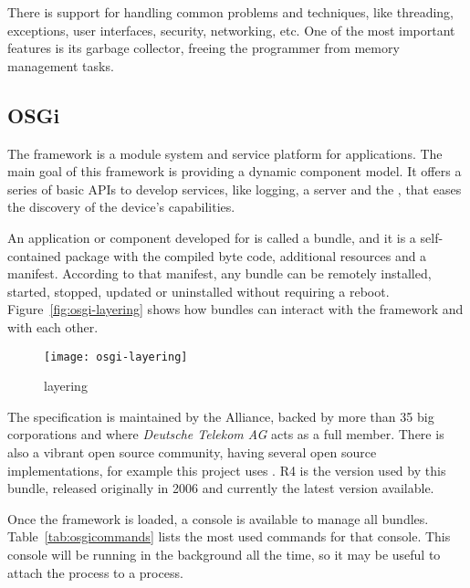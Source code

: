 There is support for handling common problems and techniques, like threading, exceptions, user interfaces, security, networking, etc.
One of the most important features is its garbage collector, freeing the programmer from memory management tasks.


\subsection{OSGi} %
\label{sub:osgi}

The  framework is a module system and service platform for  applications.
The main goal of this framework is providing a dynamic component model.
It offers a series of basic APIs to develop services, like logging, a  server and the , that eases the discovery of the device's capabilities.

An application or component developed for  is called a bundle, and it is a self-contained package with the compiled byte code, additional resources and a manifest.
According to that manifest, any bundle can be remotely installed, started, stopped, updated or uninstalled without requiring a reboot.
Figure~\vref{fig:osgi-layering} shows how bundles can interact with the framework and with each other.

\begin{figure}[htbp]
  \centering
    \texttt{[image: osgi-layering]}
  \caption{ layering}
  \label{fig:osgi-layering}
\end{figure}

The  specification is maintained by the  Alliance, backed by more than 35 big corporations and where \emph{Deutsche Telekom AG} acts as a full member.
There is also a vibrant open source community, having several open source implementations, for example this project uses  .
 R4 is the version used by this bundle, released originally in 2006 and currently the latest version available.

Once the framework is loaded, a console is available to manage all bundles.
Table~\vref{tab:osgicommands} lists the most used commands for that console.
This console will be running in the background all the time, so it may be useful to attach the process to a  process.

